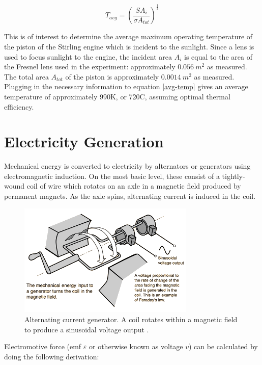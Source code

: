     \begin{equation}
        T_{avg} = \left(\frac{SA_{i}}{\sigma A_{tot}}\right)^{\frac{1}{4}}
        \label{avg-temp}
    \end{equation}
    
    This is of interest to determine the average maximum operating temperature of the piston of the Stirling engine which is incident to the sunlight. Since a lens is used to focus sunlight to the engine, the incident area $A_{i}$ is equal to the area of the Fresnel lens used in the experiment: approximately $0.056 \ m^{2}$ as measured. The total area $A_{tot}$ of the piston is approximately $0.0014 \ m^{2}$ as measured. Plugging in the necessary information to equation \ref{avg-temp} gives an average temperature of approximately 990K, or 720\degree C, assuming optimal thermal efficiency.

\section{Electricity Generation}

    Mechanical energy is converted to electricity by alternators or generators using electromagnetic induction. On the most basic level, these consist of a tightly-wound coil of wire which rotates on an axle in a magnetic field produced by permanent magnets. As the axle spins, alternating current is induced in the coil.
    
    \begin{figure}[H]
        \centering
        \includegraphics[width=0.75\textwidth]{diagrams/acgen}
        \caption[A.C. generator]{Alternating current generator. A coil rotates within a magnetic field to produce a sinusoidal voltage output \cite{acgen}.}
        \label{fig:acgen}
    \end{figure}
    
    Electromotive force (emf $\varepsilon$ or otherwise known as voltage $v$) can be calculated by doing the following derivation:
    
